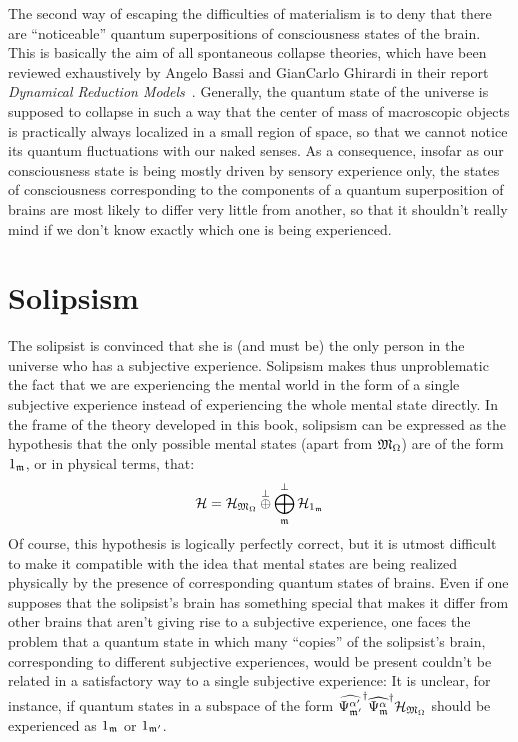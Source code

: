 The second way of escaping the difficulties of materialism is to deny that there are ``noticeable'' quantum superpositions of consciousness states of the brain. This is basically the aim of all spontaneous collapse theories, which have been reviewed exhaustively by Angelo Bassi and GianCarlo Ghirardi in their report \textit{Dynamical Reduction Models}~\cite{Bassi2003}. Generally, the quantum state of the universe is supposed to collapse in such a way that the center of mass of macroscopic objects is practically always localized in a small region of space, so that we cannot notice its quantum fluctuations with our naked senses. As a consequence, insofar as our consciousness state is being mostly driven by sensory experience only, the states of consciousness corresponding to the components of a quantum superposition of brains are most likely to differ very little from another, so that it shouldn't really mind if we don't know exactly which one is being experienced.

\section{Solipsism}

The solipsist is convinced that she is (and must be) the only person in the universe who has a subjective experience. Solipsism makes thus unproblematic the fact that we are experiencing the mental world in the form of a single subjective experience instead of experiencing the whole mental state directly. In the frame of the theory developed in this book, solipsism can be expressed as the hypothesis that the only possible mental states (apart from $\mathfrak{M}_\Omega$) are of the form ${1}_{\mathfrak{m}}$, or in physical terms, that:
\begin{equation*}
\mathcal H = \mathcal H_{\mathfrak{M}_\Omega} \overset{\perp}{\oplus} \bigoplus_{\mathfrak{m}}^\perp \mathcal H_{{1}_{\mathfrak{m}}}
\end{equation*}
Of course, this hypothesis is logically perfectly correct, but it is utmost difficult to make it compatible with the idea that mental states are being realized physically by the presence of corresponding quantum states of brains. Even if one supposes that the solipsist's brain has something special that makes it differ from other brains that aren't giving rise to a subjective experience, one faces the problem that a quantum state in which many ``copies'' of the solipsist's brain, corresponding to different subjective experiences, would be present couldn't be related in a satisfactory way to a single subjective experience: It is unclear, for instance, if quantum states in a subspace of the form $\widehat{\Psi_{\mathfrak{m}'}^{\alpha'}}^{\dagger} \widehat{\Psi_{\mathfrak{m}}^\alpha}^{\dagger} \mathcal H_{\mathfrak{M}_\Omega}$ should be experienced as ${1}_{\mathfrak{m}}$ or ${1}_{\mathfrak{m}'}$.

